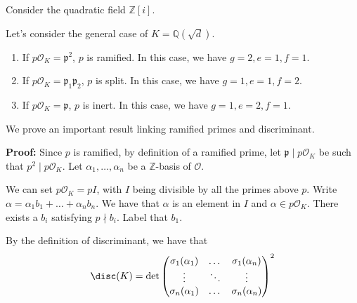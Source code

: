 \documentclass[a4paper, 12pt,oneside,openany]{book}
\begin{document}
Consider the quadratic field $\mathbb{Z}[i].$


Let's consider the general case of $K=\mathbb{Q}(\sqrt{d}).$ 

\begin{enumerate}
    \item If $p\mathcal{O}_K = \mathfrak{p}^2$, $p$ is ramified. In this case, we have $g=2, e=1, f=1.$
    \item If $p\mathcal{O}_K = \mathfrak{p}_1\mathfrak{p}_2$, $p$ is split. In this case, we have $g=1, e=1, f=2.$
    \item If $p\mathcal{O}_K=\mathfrak{p}$, $p$ is inert. In this case, we have $g=1, e=2, f=1.$
\end{enumerate}

We prove an important result linking ramified primes and discriminant.


\textbf{Proof:} Since $p$ is ramified, by definition of a ramified prime, let $\mathfrak{p} \mid p\mathcal{O}_K$ be such that $p^2 \mid p\mathcal{O}_K.$ Let $\alpha_1, \dots, \alpha_n$ be a $\mathbb{Z}$-basis of $\mathcal{O}$. 

We can set $p\mathcal{O}_K=pI$, with $I$ being divisible by all the primes above $p$. Write $\alpha=\alpha_1 b_1+\dots+\alpha_n b_n.$ We have that $\alpha$ is an element in $I$ and $\alpha \in p\mathcal{O}_K.$ There exists a $b_i$ satisfying $p \nmid b_i$. Label that $b_1.$

By the definition of discriminant, we have that $$\disc(K)=\det \begin{pmatrix}
        \sigma_1(\alpha_1)& \dots & \sigma_1(\alpha_n) \\
        \vdots & \ddots & \vdots \\
        \sigma_n(\alpha_1) & \dots & \sigma_n(\alpha_n) \\
    \end{pmatrix}^2$$
\end{document}
